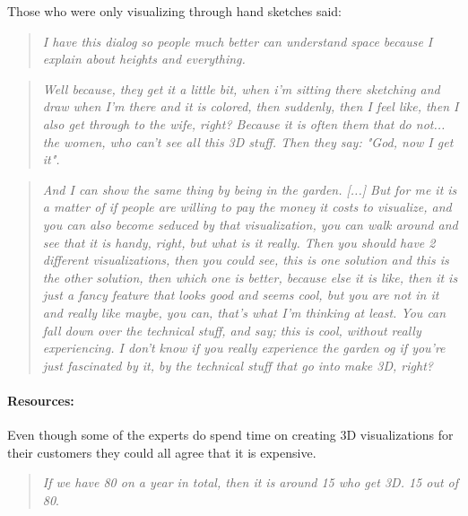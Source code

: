		Those who were only visualizing through hand sketches said:	
		\begin{quote}
			\textit{I have this dialog so people much better can understand space because I explain about heights and everything.}\label{quote:expertRoom3}\\
		\end{quote}
	
		\begin{quote}
			\textit{Well because, they get it a little bit, when i'm sitting there sketching and draw when I'm there and it is colored, then suddenly, then I feel like, then I also get through to the wife, right? Because it is often them that do not... the women, who can't see all this 3D stuff. Then they say: "God, now I get it".}\label{quote:expertRoom4}\\
		\end{quote}
	
		\begin{quote}
			\textit{And I can show the same thing by being in the garden. [...] But for me it is a matter of if people are willing to pay the money it costs to visualize, and you can also become seduced by that visualization, you can walk around and see that it is handy, right, but what is it really. Then you should have 2 different visualizations, then you could see, this is one solution and this is the other solution, then which one is better, because else it is like, then it is just a fancy feature that looks good and seems cool, but you are not in it and really like maybe, you can, that's what I'm thinking at least. You can fall down over the technical stuff, and say; this is cool, without really experiencing. I don't know if you really experience the garden og if you're just fascinated by it, by the technical stuff that go into make 3D, right?}\label{quote:expertRoom5}\\
		\end{quote}
		
		\paragraph*{Resources:}
		Even though some of the experts do spend time on creating 3D visualizations for their customers they could all agree that it is expensive.\\
		
		\begin{quote}
			\textit{If we have 80 on a year in total, then it is around 15 who get 3D. 15 out of 80}\label{quote:expertRessources1}.\\
		\end{quote}
		
